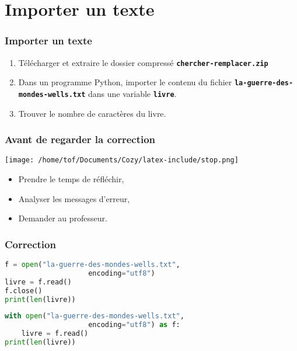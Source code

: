 \documentclass[svgnames,11pt]{beamer}
\begin{document}
\section{Importer un texte}
\begin{frame}
    \frametitle{Importer un texte}

    \begin{activite}
    \begin{enumerate}
        \item Télécharger et extraire le dossier compressé \texttt{\textbf{chercher-remplacer.zip}}
        \item Dans un programme Python, importer le contenu du fichier \texttt{\textbf{la-guerre-des-mondes-wells.txt}} dans une variable \textbf{\texttt{livre}}.
        \item Trouver le nombre de caractères du livre.
    \end{enumerate}
    \end{activite}

\end{frame}
\begin{frame}
    \frametitle{Avant de regarder la correction}
\begin{center}
    \centering
    \texttt{[image: /home/tof/Documents/Cozy/latex-include/stop.png]}
    \end{center}
{\Large
    \begin{itemize}
        \item Prendre le temps de réfléchir,
        \item Analyser les messages d'erreur,
        \item Demander au professeur.
    \end{itemize}
}
\end{frame}
\begin{frame}[fragile]
    \frametitle{Correction}
    \begin{center}
    \begin{lstlisting}[language=Python ,basicstyle=\ttfamily\small, xleftmargin=2em, xrightmargin=2em]
f = open("la-guerre-des-mondes-wells.txt", 
                    encoding="utf8")
livre = f.read()
f.close()
print(len(livre))
\end{lstlisting}
    \label{importer}
    \end{center}

 \begin{center}
    \begin{lstlisting}[language=Python , basicstyle=\ttfamily\small, xleftmargin=2em, xrightmargin=2em]
with open("la-guerre-des-mondes-wells.txt", 
                    encoding="utf8") as f:
    livre = f.read()
print(len(livre))
\end{lstlisting}
    \label{importer2}
    \end{center}
\end{frame}
\end{document}
